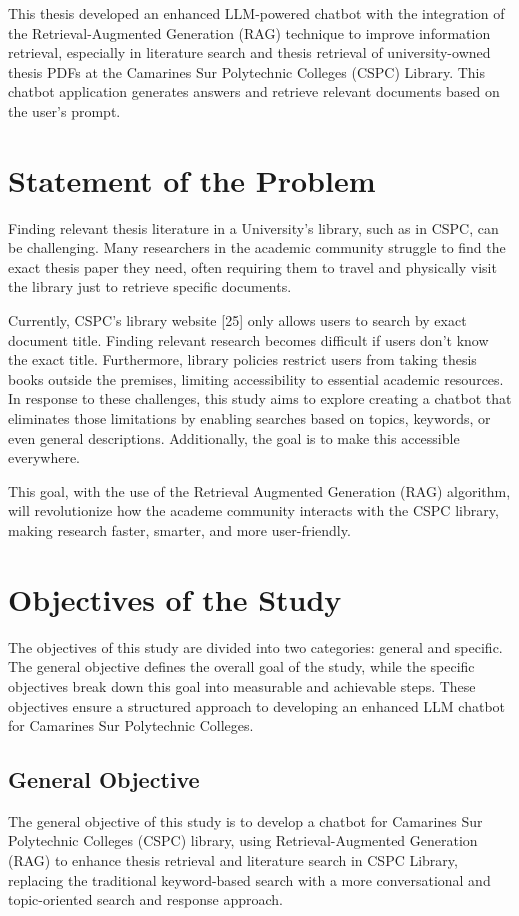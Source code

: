 \begin{refsection}
\bigbreak
This thesis developed an enhanced LLM-powered chatbot with the integration of the Retrieval-Augmented Generation (RAG) technique to improve information retrieval, especially in literature search and thesis retrieval of university-owned thesis PDFs at the Camarines Sur Polytechnic Colleges (CSPC) Library. This chatbot application generates answers and retrieve relevant documents based on the user's prompt.


\section{Statement of the Problem}

Finding relevant thesis literature in a University's library, such as in CSPC, can be challenging. Many researchers in the academic community struggle to find the exact thesis paper they need, often requiring them to travel and physically visit the library just to retrieve specific documents.

\bigbreak
Currently, CSPC’s library website [25] only allows users to search by exact document title. Finding relevant research becomes difficult if users don’t know the exact title. Furthermore, library policies restrict users from taking thesis books outside the premises, limiting accessibility to essential academic resources. In response to these challenges, this study aims to explore creating a chatbot that eliminates those limitations by enabling searches based on topics, keywords, or even general descriptions. Additionally, the goal is to make this accessible everywhere.

This goal, with the use of the Retrieval Augmented Generation (RAG) algorithm, will revolutionize how the academe community interacts with the CSPC library, making research faster, smarter, and more user-friendly. 


\section{Objectives of the Study}
The objectives of this study are divided into two categories: general and specific. The general objective defines the overall goal of the study, while the specific objectives break down this goal into measurable and achievable steps. These objectives ensure a structured approach to developing an enhanced LLM chatbot for Camarines Sur Polytechnic Colleges. 

\subsection{General Objective}
The general objective of this study is to develop a chatbot for  Camarines Sur Polytechnic Colleges (CSPC) library, using Retrieval-Augmented Generation (RAG) to enhance thesis retrieval and literature search in CSPC Library, replacing the traditional keyword-based search with a more conversational and topic-oriented search and response approach.


\end{refsection}
